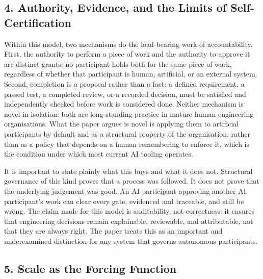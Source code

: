 \documentclass[
]{article}
\begin{document}
\hypertarget{authority-evidence-and-the-limits-of-self-certification}{%
\subsection{4. Authority, Evidence, and the Limits of
Self-Certification}\label{authority-evidence-and-the-limits-of-self-certification}}

Within this model, two mechanisms do the load-bearing work of
accountability. First, the authority to perform a piece of work and the
authority to approve it are distinct grants; no participant holds both
for the same piece of work, regardless of whether that participant is
human, artificial, or an external system. Second, completion is a
proposal rather than a fact: a defined requirement, a passed test, a
completed review, or a recorded decision, must be satisfied and
independently checked before work is considered done. Neither mechanism
is novel in isolation; both are long-standing practice in mature human
engineering organisations. What the paper argues is novel is applying
them to artificial participants by default and as a structural property
of the organisation, rather than as a policy that depends on a human
remembering to enforce it, which is the condition under which most
current AI tooling operates.

It is important to state plainly what this buys and what it does not.
Structural governance of this kind proves that a process was followed.
It does not prove that the underlying judgement was good. An AI
participant approving another AI participant's work can clear every
gate, evidenced and traceable, and still be wrong. The claim made for
this model is auditability, not correctness: it ensures that engineering
decisions remain explainable, reviewable, and attributable, not that
they are always right. The paper treats this as an important and
underexamined distinction for any system that governs autonomous
participants.

\hypertarget{scale-as-the-forcing-function}{%
\subsection{5. Scale as the Forcing
Function}\label{scale-as-the-forcing-function}}
\end{document}
